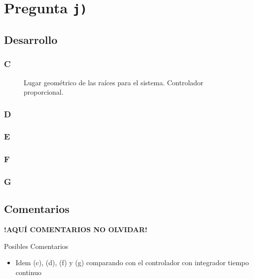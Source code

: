 \section{Pregunta \texttt{j)}}\label{pregunta-j}
\subsection{Desarrollo}

\subsubsection{C} %

\begin{figure}[ht]
  \centering
  
  \caption{Lugar geométrico de las raíces para el sistema. Controlador proporcional.}
  \label{fig:lgr-j}
\end{figure}

\FloatBarrier
\subsubsection{D}%

\FloatBarrier
\subsubsection{E}%

\FloatBarrier
\subsubsection{F}%

\FloatBarrier
\subsubsection{G}%


\FloatBarrier
\subsection{Comentarios}


\textbf{!AQUÍ COMENTARIOS NO OLVIDAR!}

Posibles Comentarios
\begin{itemize}
    \item Idem (c), (d), (f) y (g) comparando con el controlador con integrador tiempo continuo
\end{itemize}
